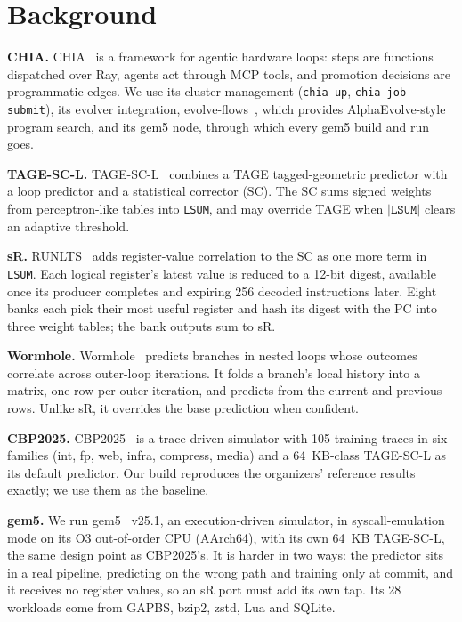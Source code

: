 \documentclass[conference]{IEEEtran}
\begin{document}
\section{Background} \label{sec:background}

\textbf{CHIA.} CHIA~\cite{chia} is a framework for agentic hardware loops:
steps are functions dispatched over Ray, agents act through MCP tools, and
promotion decisions are programmatic edges. We use its cluster management
(\texttt{chia up}, \texttt{chia job submit}), its evolver integration,
evolve-flows~\cite{evolveflows}, which provides
AlphaEvolve-style~\cite{alphaevolve} program search, and its gem5 node,
through which every gem5 build and run goes.

\textbf{TAGE-SC-L.} TAGE-SC-L~\cite{tagescl} combines a TAGE tagged-geometric
predictor with a loop predictor and a statistical corrector (SC). The SC sums
signed weights from perceptron-like tables into \texttt{LSUM}, and may
override TAGE when $|\texttt{LSUM}|$ clears an adaptive threshold.

\textbf{sR.} RUNLTS~\cite{runlts} adds register-value correlation to the SC as
one more term in \texttt{LSUM}. Each logical register's latest value is
reduced to a 12-bit digest, available once its producer completes and
expiring 256 decoded instructions later. Eight banks each pick their most
useful register and hash its digest with the PC into three weight tables; the
bank outputs sum to sR.

\textbf{Wormhole.} Wormhole~\cite{wormhole} predicts branches in nested loops
whose outcomes correlate across outer-loop iterations. It folds a branch's
local history into a matrix, one row per outer iteration, and predicts from
the current and previous rows. Unlike sR, it overrides the base prediction
when confident.

\textbf{CBP2025.} CBP2025~\cite{cbp2025kit} is a trace-driven simulator with
105 training traces in six families (int, fp, web, infra, compress, media)
and a 64~KB-class TAGE-SC-L as its default predictor. Our build reproduces the
organizers' reference results exactly; we use them as the baseline.

\textbf{gem5.} We run gem5~\cite{gem5} v25.1, an execution-driven simulator,
in syscall-emulation mode on its O3 out-of-order CPU (AArch64), with its own
64~KB TAGE-SC-L, the same design point as CBP2025's. It is harder in two ways:
the predictor sits in a real pipeline, predicting on the wrong path and
training only at commit, and it receives no register values, so an sR port
must add its own tap. Its 28 workloads come from GAPBS, bzip2, zstd, Lua and SQLite.
\end{document}
